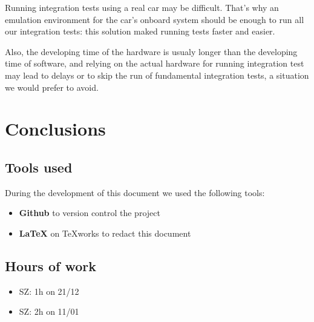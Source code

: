 \documentclass[11pt]{article} %
\begin{document}
Running integration tests using a real car may be difficult. That's why an emulation environment for the car's onboard system should be enough to run all our integration tests: this solution maked running tests faster and easier. 

Also, the developing time of the hardware is usualy longer than the developing time of software, and relying on the actual hardware for running integration test may lead to delays or to skip the run of fundamental integration tests, a situation we would prefer to avoid.


\newpage
\section{Conclusions}

\subsection{Tools used}
During the development of this document we used the following tools:
\begin{itemize}
	\item \textbf{Github} to version control the project
	\item \textbf{\LaTeX} on TeXworks to redact this document
\end{itemize}

\subsection{Hours of work}
\begin{itemize}
	\item SZ: 1h on 21/12
	\item SZ: 2h on 11/01
\end{itemize}
\end{document}
